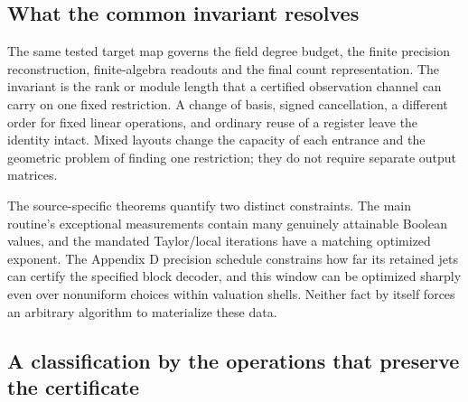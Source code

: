 \documentclass[
  11pt,
]{article}
\begin{document}
\subsection{What the common invariant
resolves}\label{what-the-common-invariant-resolves}

The same tested target map governs the field degree budget, the finite
precision reconstruction, finite-algebra readouts and the final count
representation. The invariant is the rank or module length that a
certified observation channel can carry on one fixed restriction. A
change of basis, signed cancellation, a different order for fixed linear
operations, and ordinary reuse of a register leave the identity intact.
Mixed layouts change the capacity of each entrance and the geometric
problem of finding one restriction; they do not require separate output
matrices.

The source-specific theorems quantify two distinct constraints. The main
routine's exceptional measurements contain many genuinely attainable
Boolean values, and the mandated Taylor/local iterations have a matching
optimized exponent. The Appendix D precision schedule constrains how far
its retained jets can certify the specified block decoder, and this
window can be optimized sharply even over nonuniform choices within
valuation shells. Neither fact by itself forces an arbitrary algorithm
to materialize these data.

\subsection{A classification by the operations that preserve the
certificate}\label{a-classification-by-the-operations-that-preserve-the-certificate}
\end{document}
